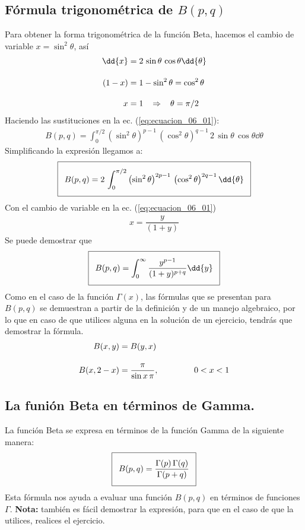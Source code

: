 \subsection{Fórmula trigonométrica de $B(p,q)$}
Para obtener la forma trigonométrica de la función Beta, hacemos el cambio de variable $x = \sin^{2} \theta$, así
\begin{align*}
\dd{x} &= 2 \, \sin \theta \, \cos \theta \dd{\theta} \\[1em]
(1 - x) &= 1 - \sin^{2} \theta = \cos^{2} \theta \\[1em]
x &= 1 \hspace{0.3cm} \Rightarrow \hspace{0.3cm} \theta = \pi/2
\end{align*}
Haciendo las sustituciones en la ec. (\ref{eq:ecuacion_06_01}):
{\fontsize{12}{12}\selectfont
\begin{align}
B(p, q) = \int_{0}^{\pi/2} \left( \sin^{2} \theta \right)^{p-1} \, \left( \cos^{2} \theta \right)^{q-1} \, 2 \, \sin \theta \, \cos \theta \dd{\theta}
\end{align}}
Simplificando la expresión llegamos a:
{\fontsize{12}{12}\selectfont
\begin{align}
\addtolength{\fboxsep}{5pt}\boxed{B(p, q) = 2 \, \int_{0}^{\pi/2} \left( \sin^{2} \theta \right)^{2p-1} \, \left( \cos^{2} \theta \right)^{2q-1} \dd{\theta}}
\label{eq:ecuacion_06_04}
\end{align}}
Con el cambio de variable en la ec. (\ref{eq:ecuacion_06_01})
\begin{align*}
x = \dfrac{y}{(1 + y)}
\end{align*}
Se puede demostrar que
\begin{align}
\addtolength{\fboxsep}{5pt}\boxed{B(p, q) = \int_{0}^{\infty} \dfrac{y^{p-1}}{(1 + y)^{p+q}} \dd{y}}
\label{eq:ecuacion_06_05}
\end{align}   
Como en el caso de la función $\Gamma (x)$, las fórmulas que se presentan para $B(p, q)$ se demuestran a partir de la definición y de un manejo algebraico, por lo que en caso de que utilices alguna en la solución de un ejercicio, tendrás que demostrar la fórmula.
\begin{align*}
B (x, y) &= B (y, x) \\[1em]
B (x, 2-x) &= \dfrac{\pi}{\sin x \, \pi}, \hspace{1.5cm} 0 < x < 1   
\end{align*}
\subsection{La funión Beta en términos de Gamma.}
La función Beta se expresa en términos de la función Gamma de la siguiente manera:
\begin{align}
\addtolength{\fboxsep}{5pt}\boxed{B(p, q) = \dfrac{\Gamma(p) \, \Gamma(q)}{\Gamma (p + q)}}
\label{eq:ecuacion_07_01}
\end{align}
Esta fórmula nos ayuda a evaluar una función $B (p, q)$ en términos de funciones $\Gamma$. \textbf{Nota: } también es fácil demostrar la expresión, para que en el caso de que la utilices, realices el ejercicio.
